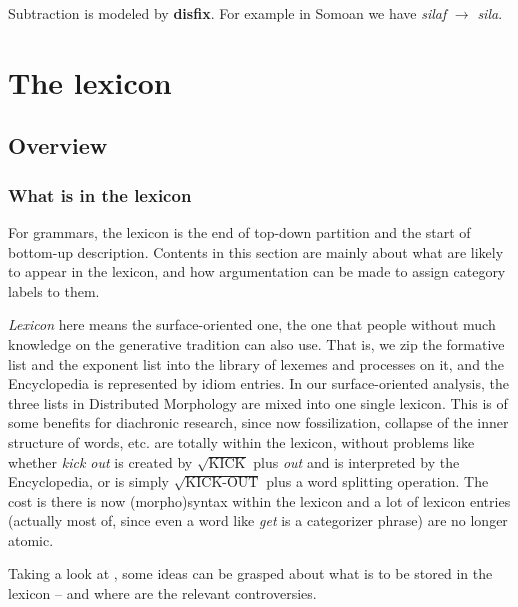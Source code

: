 \documentclass[UTF8, a4paper, oneside, scheme=plain]{ctexart}
\newcommand*{\concept}[1]{\textbf{#1}}
\newcommand*{\term}[1]{\emph{#1}}
\newcommand*{\corpus}[1]{\emph{#1}}
\begin{document}
Subtraction is modeled by \concept{disfix}.
For example in Somoan we have \corpus{silaf} $\to$ \corpus{sila}.

\section{The lexicon}\label{sec:lexicon}

\subsection{Overview}

\subsubsection{What is in the lexicon}\label{sec:lexicon-content}

For grammars, the lexicon is the end of top-down partition
and the start of bottom-up description.
Contents in this section are mainly about what are likely to appear in the lexicon,
and how argumentation can be made to assign category labels to them.

\term{Lexicon} here means the surface-oriented one,
the one that people without much knowledge on the generative tradition can also use.
That is, we zip the formative list and the exponent list into 
the library of lexemes and processes on it,
and the Encyclopedia is represented by idiom entries.
In our surface-oriented analysis,
the three lists in Distributed Morphology are mixed into one single lexicon.
This is of some benefits for diachronic research,
since now fossilization, collapse of the inner structure of words, etc. 
are totally within the lexicon,
without problems like whether 
\corpus{kick out} is created by $\sqrt{\text{KICK}}$ plus \corpus{out}
and is interpreted by the Encyclopedia,
or is simply $\sqrt{\text{KICK-OUT}}$ plus a word splitting operation.
The cost is there is now (morpho)syntax within the lexicon
and a lot of lexicon entries 
(actually most of, since even a word like \corpus{get} is a categorizer phrase)
are no longer atomic.

Taking a look at ,
some ideas can be grasped about what is to be stored in the lexicon
-- and where are the relevant controversies.
\end{document}
